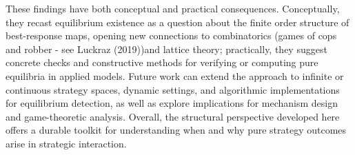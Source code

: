 \documentclass[11pt]{article}
\begin{document}
These findings have both conceptual and practical consequences. Conceptually, they recast equilibrium existence as a question about the finite order structure of best-response maps, opening new connections to combinatorics (games of cops and robber - see Luckraz (2019))and lattice theory; practically, they suggest concrete checks and constructive methods for verifying or computing pure equilibria in applied models. Future work can extend the approach to infinite or continuous strategy spaces, dynamic settings, and algorithmic implementations for equilibrium detection, as well as explore implications for mechanism design and game-theoretic analysis. Overall, the structural perspective developed here offers a durable toolkit for understanding when and why pure strategy outcomes arise in strategic interaction.
\end{document}
